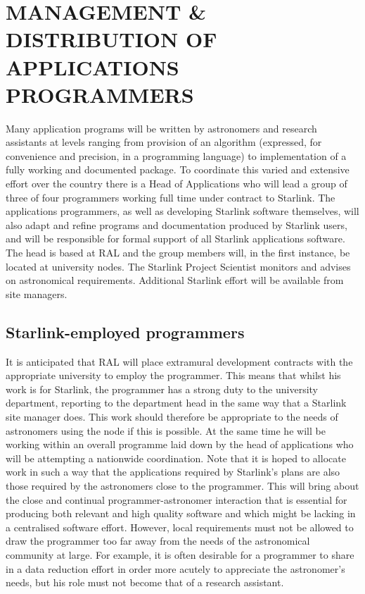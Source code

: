 \section {MANAGEMENT \& DISTRIBUTION OF APPLICATIONS PROGRAMMERS}
Many application programs will be written by astronomers and research
assistants at levels ranging from provision of an algorithm (expressed, for
convenience and precision, in a programming language) to implementation of a
fully working and documented package.
To coordinate this varied and extensive effort over the country there is a
Head of Applications who will lead a group of three of four programmers working
full time under contract to Starlink.
The applications programmers, as well as developing Starlink software
themselves, will also adapt and refine programs and documentation produced by
Starlink users, and will be responsible for formal support of all Starlink
applications software.
The head is based at RAL and the group members will, in the first instance, be
located at university nodes.
The Starlink Project Scientist monitors and advises on astronomical
requirements.
Additional Starlink effort will be available from site managers.
\subsection {Starlink-employed programmers}
It is anticipated that RAL will place extramural development contracts with the
appropriate university to employ the programmer.
This means that whilst his work is for Starlink, the programmer has a strong
duty to the university department, reporting to the department head in the same
way that a Starlink site manager does.
This work should therefore be appropriate to the needs of astronomers using the
node if this is possible.
At the same time he will be working within an overall programme laid down by the
head of applications who will be attempting a nationwide coordination.
Note that it is hoped to allocate work in such a way that the applications
required by Starlink's plans are also those required by the astronomers close to
the programmer.
This will bring about the close and continual programmer-astronomer interaction
that is essential for producing both relevant and high quality software and
which might be lacking in a centralised software effort.
However, local requirements must not be allowed to draw the programmer too far
away from the needs of the astronomical community at large.
For example, it is often desirable for a programmer to share in a data reduction
effort in order more acutely to appreciate the astronomer's needs, but his role
must not become that of a research assistant.
